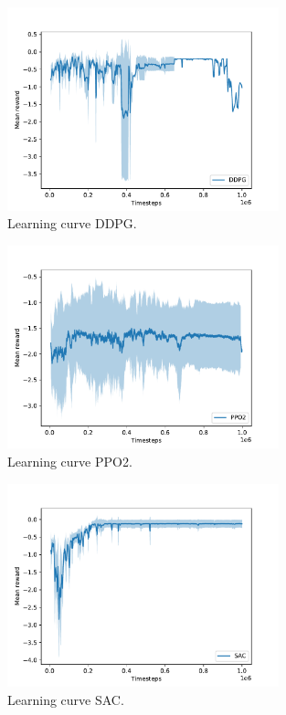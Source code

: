 \documentclass{article}
\begin{document}
\begin{figure}[H]
    \centering
    \includegraphics[width=0.7\textwidth]{../DDPG.pdf}
\caption{Learning curve DDPG.}
\end{figure}

\begin{figure}[H]
    \centering
    \includegraphics[width=0.7\textwidth]{../PPO2.pdf}
\caption{Learning curve PPO2.}
\end{figure}

\begin{figure}[H]
    \centering
    \includegraphics[width=0.7\textwidth]{../SAC.pdf}
\caption{Learning curve SAC.}
\end{figure}
\end{document}

